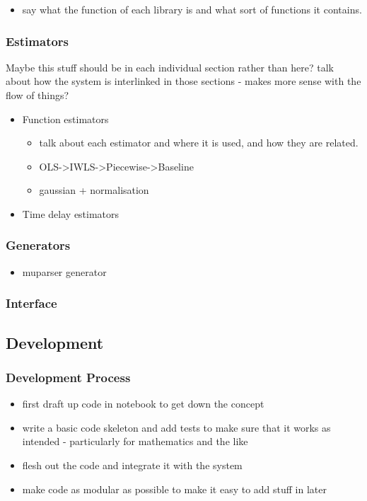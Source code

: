 \documentclass[a4paper,11pt]{article}
\begin{document}
\begin{itemize}
\item say what the function of each library is and what sort of functions it
      contains.
\end{itemize}
\subsubsection{Estimators}
\label{sec-6-1-3}

Maybe this stuff should be in each individual section rather than here? talk
about how the system is interlinked in those sections - makes more sense with
the flow of things?
\begin{itemize}

\item Function estimators
\label{sec-6-1-3-1}%
\begin{itemize}
\item talk about each estimator and where it is used, and how they are related.
\item OLS->IWLS->Piecewise->Baseline
\item gaussian + normalisation
\end{itemize}

\item Time delay estimators
\label{sec-6-1-3-2}%
\end{itemize} %
\subsubsection{Generators}
\label{sec-6-1-4}

\begin{itemize}
\item muparser generator
\end{itemize}
\subsubsection{Interface}
\label{sec-6-1-5}
\subsection{Development}
\label{sec-6-2}
\subsubsection{Development Process}
\label{sec-6-2-1}

\begin{itemize}
\item first draft up code in notebook to get down the concept
\item write a basic code skeleton and add tests to make sure that it works as
  intended - particularly for mathematics and the like
\item flesh out the code and integrate it with the system
\item make code as modular as possible to make it easy to add stuff in later
\end{itemize}
\end{document}
